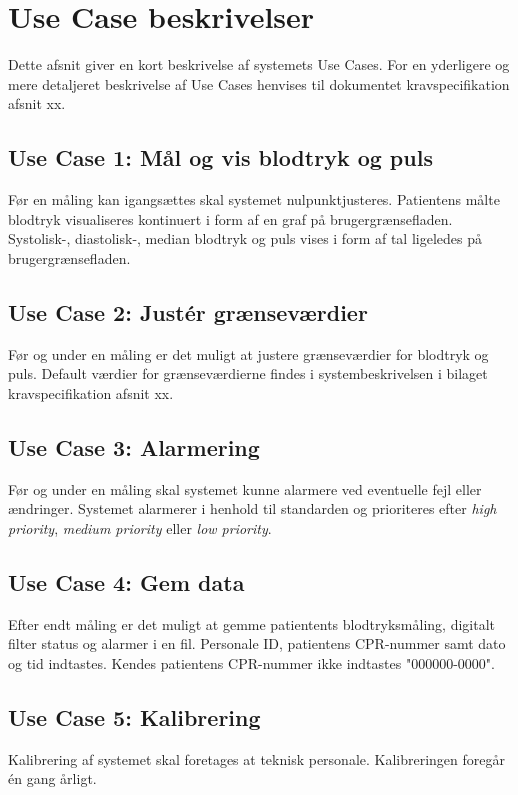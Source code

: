 \section{Use Case beskrivelser}
Dette afsnit giver en kort beskrivelse af systemets Use Cases. For en yderligere og mere detaljeret beskrivelse af Use Cases henvises til dokumentet kravspecifikation afsnit xx. 
\subsection{Use Case 1: Mål og vis blodtryk og puls}
Før en måling kan igangsættes skal systemet nulpunktjusteres. Patientens målte blodtryk visualiseres kontinuert i form af en graf på brugergrænsefladen. Systolisk-, diastolisk-, median blodtryk og puls vises i form af tal ligeledes på brugergrænsefladen.
\subsection{Use Case 2: Justér grænseværdier}
Før og under en måling er det muligt at justere grænseværdier for blodtryk og puls. Default værdier for grænseværdierne findes i systembeskrivelsen i bilaget kravspecifikation afsnit xx.
\subsection{Use Case 3: Alarmering}
Før og under en måling skal systemet kunne alarmere ved eventuelle fejl eller ændringer. Systemet alarmerer i henhold til standarden og prioriteres efter \textit{high priority}, \textit{medium priority} eller \textit{low priority}.
\subsection{Use Case 4: Gem data}
Efter endt måling er det muligt at gemme patientents blodtryksmåling, digitalt filter status og alarmer i en fil. Personale ID, patientens CPR-nummer samt dato og tid indtastes. Kendes patientens CPR-nummer ikke indtastes "000000-0000".
\subsection{Use Case 5: Kalibrering}
Kalibrering af systemet skal foretages at teknisk personale. Kalibreringen foregår én gang årligt.
